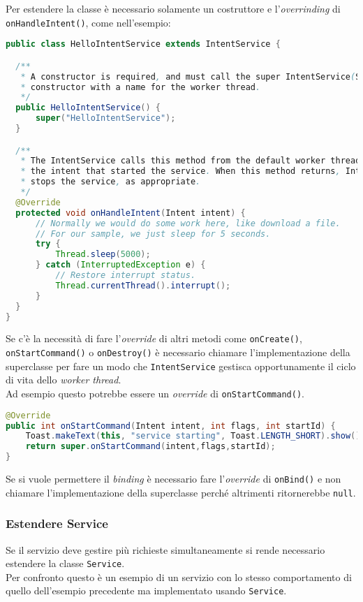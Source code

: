Per estendere la classe è necessario solamente un costruttore e l'\textit{overrinding} di \texttt{onHandleIntent()}, come nell'esempio:

\begin{lstlisting}[language=Java]
public class HelloIntentService extends IntentService {

  /**
   * A constructor is required, and must call the super IntentService(String)
   * constructor with a name for the worker thread.
   */
  public HelloIntentService() {
      super("HelloIntentService");
  }

  /**
   * The IntentService calls this method from the default worker thread with
   * the intent that started the service. When this method returns, IntentService
   * stops the service, as appropriate.
   */
  @Override
  protected void onHandleIntent(Intent intent) {
      // Normally we would do some work here, like download a file.
      // For our sample, we just sleep for 5 seconds.
      try {
          Thread.sleep(5000);
      } catch (InterruptedException e) {
          // Restore interrupt status.
          Thread.currentThread().interrupt();
      }
  }
}
\end{lstlisting}

Se c'è la necessità di fare l'\textit{override} di altri metodi come \texttt{onCreate()}, \texttt{onStartCommand()} o \texttt{onDestroy()} è necessario chiamare l'implementazione della superclasse per fare un modo che \texttt{IntentService} gestisca opportunamente il ciclo di vita dello \textit{worker thread}.\\
Ad esempio questo potrebbe essere un \textit{override} di \texttt{onStartCommand()}.
\begin{lstlisting}[language=Java]
@Override
public int onStartCommand(Intent intent, int flags, int startId) {
    Toast.makeText(this, "service starting", Toast.LENGTH_SHORT).show();
    return super.onStartCommand(intent,flags,startId);
}
\end{lstlisting}

Se si vuole permettere il \textit{binding} è necessario fare l'\textit{override} di \texttt{onBind()} e non chiamare l'implementazione della superclasse perché altrimenti ritornerebbe \texttt{null}.\\


\subsubsection{Estendere Service}
Se il servizio deve gestire più richieste simultaneamente si rende necessario estendere la classe \texttt{Service}.\\
Per confronto questo è un esempio di un servizio con lo stesso comportamento di quello dell'esempio precedente ma implementato usando \texttt{Service}.

